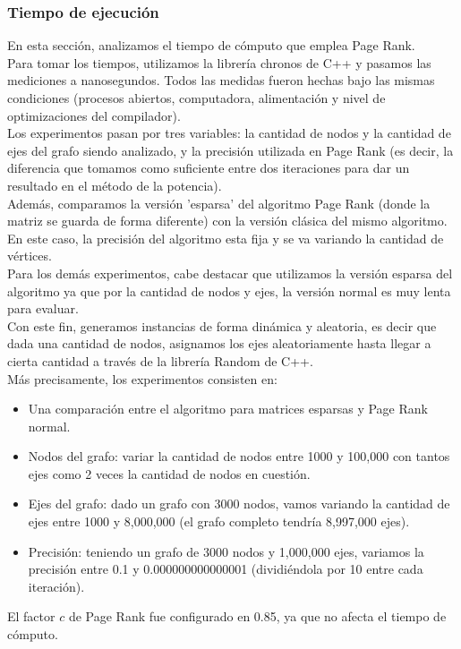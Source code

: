\subsubsection{Tiempo de ejecución}

En esta sección, analizamos el tiempo de cómputo que emplea Page Rank.\\
Para tomar los tiempos, utilizamos la librería chronos de C++ y pasamos las mediciones a nanosegundos. Todos las medidas fueron hechas bajo las mismas condiciones (procesos abiertos, computadora, alimentación y nivel de optimizaciones del compilador).\\
Los experimentos pasan por tres variables: la cantidad de nodos y la cantidad de ejes del grafo siendo analizado, y la precisión utilizada en Page Rank (es decir, la diferencia que tomamos como suficiente entre dos iteraciones para dar un resultado en el método de la potencia).\\
Además, comparamos la versión 'esparsa' del algoritmo Page Rank (donde la matriz se guarda de forma diferente) con la versión clásica del mismo algoritmo. En este caso, la precisión del algoritmo esta fija y se va variando la cantidad de vértices.\\
Para los demás experimentos, cabe destacar que utilizamos la versión esparsa del algoritmo ya que por la cantidad de nodos y ejes, la versión normal es muy lenta para evaluar.\\
Con este fin, generamos instancias de forma dinámica y aleatoria, es decir que dada una cantidad de nodos, asignamos los ejes aleatoriamente hasta llegar a cierta cantidad a través de la librería Random de C++.\\
Más precisamente, los experimentos consisten en:
\begin{itemize}
    \item Una comparación entre el algoritmo para matrices esparsas y Page Rank normal.
    \item Nodos del grafo: variar la cantidad de nodos entre 1000 y 100,000 con tantos ejes como 2 veces la cantidad de nodos en cuestión.
    \item Ejes del grafo: dado un grafo con 3000 nodos, vamos variando la cantidad de ejes entre 1000 y 8,000,000 (el grafo completo tendría 8,997,000 ejes).
    \item Precisión: teniendo un grafo de 3000 nodos y 1,000,000 ejes, variamos la precisión entre 0.1 y 0.000000000000001 (dividiéndola por 10 entre cada iteración).
\end{itemize}
El factor $c$ de Page Rank fue configurado en 0.85, ya que no afecta el tiempo de cómputo.\\


